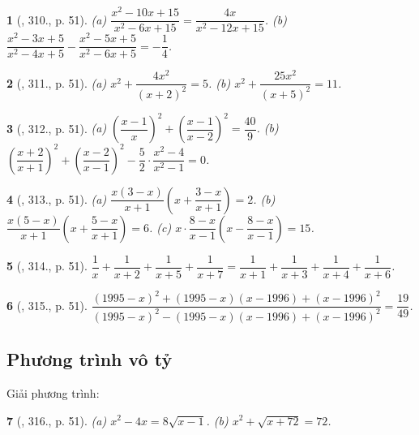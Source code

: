 \documentclass{article}
\newtheorem{baitoan}{}
\begin{document}
\begin{baitoan}[\cite{Binh_Toan_9_tap_2}, 310., p. 51]
	(a) $\dfrac{x^2 - 10x + 15}{x^2 - 6x + 15} = \dfrac{4x}{x^2 - 12x + 15}$. (b) $\dfrac{x^2 - 3x + 5}{x^2 - 4x + 5} - \dfrac{x^2 - 5x + 5}{x^2 - 6x + 5} = -\dfrac{1}{4}$.
\end{baitoan}

\begin{baitoan}[\cite{Binh_Toan_9_tap_2}, 311., p. 51]
	(a) $x^2 + \dfrac{4x^2}{(x + 2)^2} = 5$. (b) $x^2 + \dfrac{25x^2}{(x + 5)^2} = 11$.
\end{baitoan}

\begin{baitoan}[\cite{Binh_Toan_9_tap_2}, 312., p. 51]
	(a) $\left(\dfrac{x - 1}{x}\right)^2 + \left(\dfrac{x - 1}{x - 2}\right)^2 = \dfrac{40}{9}$. (b) $\left(\dfrac{x + 2}{x + 1}\right)^2 + \left(\dfrac{x - 2}{x - 1}\right)^2 - \dfrac{5}{2}\cdot\dfrac{x^2 - 4}{x^2 - 1} = 0$.
\end{baitoan}

\begin{baitoan}[\cite{Binh_Toan_9_tap_2}, 313., p. 51]
	(a) $\dfrac{x(3 - x)}{x + 1}\left(x + \dfrac{3 - x}{x + 1}\right) = 2$. (b) $\dfrac{x(5 - x)}{x + 1}\left(x + \dfrac{5 - x}{x + 1}\right) = 6$. (c) $x\cdot\dfrac{8 - x}{x - 1}\left(x - \dfrac{8 - x}{x - 1}\right) = 15$.
\end{baitoan}

\begin{baitoan}[\cite{Binh_Toan_9_tap_2}, 314., p. 51]
	$\dfrac{1}{x} + \dfrac{1}{x + 2} + \dfrac{1}{x + 5} + \dfrac{1}{x + 7} = \dfrac{1}{x + 1} + \dfrac{1}{x + 3} + \dfrac{1}{x + 4} + \dfrac{1}{x + 6}$.
\end{baitoan}

\begin{baitoan}[\cite{Binh_Toan_9_tap_2}, 315., p. 51]
	$\dfrac{(1995 - x)^2 + (1995 - x)(x - 1996) + (x - 1996)^2}{(1995 - x)^2 - (1995 - x)(x - 1996) + (x - 1996)^2} = \dfrac{19}{49}$.
\end{baitoan}

\subsection{Phương trình vô tỷ}
Giải phương trình:

\begin{baitoan}[\cite{Binh_Toan_9_tap_2}, 316., p. 51]
	(a) $x^2 - 4x = 8\sqrt{x - 1}$. (b) $x^2 + \sqrt{x + 72} = 72$.
\end{baitoan}
\end{document}
